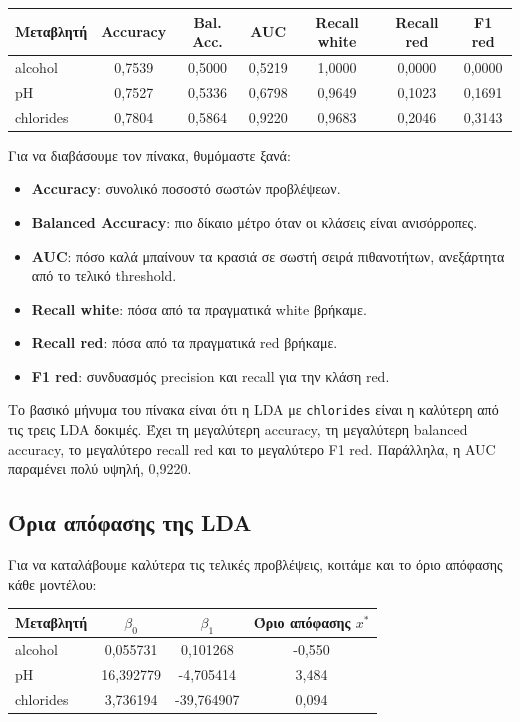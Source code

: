 \documentclass[11pt,a4paper]{article}
\newcommand{\code}[1]{\texttt{#1}}
\begin{document}
\begin{center}
\begin{tabular}{lcccccc}
\toprule
Μεταβλητή & Accuracy & Bal. Acc. & AUC & Recall white & Recall red & F1 red \\
\midrule
alcohol & 0,7539 & 0,5000 & 0,5219 & 1,0000 & 0,0000 & 0,0000 \\
pH & 0,7527 & 0,5336 & 0,6798 & 0,9649 & 0,1023 & 0,1691 \\
chlorides & 0,7804 & 0,5864 & 0,9220 & 0,9683 & 0,2046 & 0,3143 \\
\bottomrule
\end{tabular}
\end{center}

Για να διαβάσουμε τον πίνακα, θυμόμαστε ξανά:
\begin{itemize}
    \item \textbf{Accuracy}: συνολικό ποσοστό σωστών προβλέψεων.
    \item \textbf{Balanced Accuracy}: πιο δίκαιο μέτρο όταν οι κλάσεις είναι
    ανισόρροπες.
    \item \textbf{AUC}: πόσο καλά μπαίνουν τα κρασιά σε σωστή σειρά
    πιθανοτήτων, ανεξάρτητα από το τελικό threshold.
    \item \textbf{Recall white}: πόσα από τα πραγματικά white βρήκαμε.
    \item \textbf{Recall red}: πόσα από τα πραγματικά red βρήκαμε.
    \item \textbf{F1 red}: συνδυασμός precision και recall για την κλάση red.
\end{itemize}

Το βασικό μήνυμα του πίνακα είναι ότι η LDA με \code{chlorides} είναι η
καλύτερη από τις τρεις LDA δοκιμές. Έχει τη μεγαλύτερη accuracy, τη
μεγαλύτερη balanced accuracy, το μεγαλύτερο recall red και το μεγαλύτερο
F1 red. Παράλληλα, η AUC παραμένει πολύ υψηλή, 0,9220.

\subsection{Όρια απόφασης της LDA}

Για να καταλάβουμε καλύτερα τις τελικές προβλέψεις, κοιτάμε και το όριο
απόφασης κάθε μοντέλου:

\begin{center}
\begin{tabular}{lccc}
\toprule
Μεταβλητή & \(\beta_0\) & \(\beta_1\) & Όριο απόφασης \(x^*\) \\
\midrule
alcohol & 0,055731 & 0,101268 & -0,550 \\
pH & 16,392779 & -4,705414 & 3,484 \\
chlorides & 3,736194 & -39,764907 & 0,094 \\
\bottomrule
\end{tabular}
\end{center}
\end{document}
